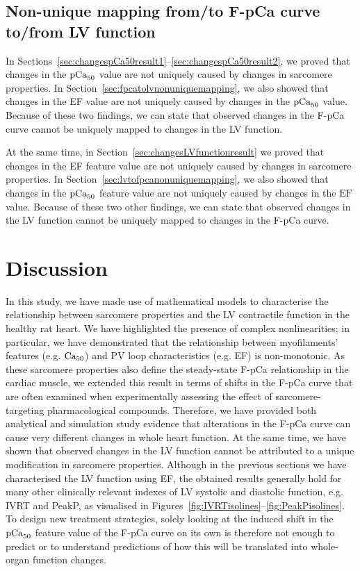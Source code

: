 %
%
%
\subsection{Non-unique mapping from/to F-pCa curve to/from LV function}\label{sec:ch8nonuniquemappings}
In Sections~\ref{sec:changespCa50result1}--\ref{sec:changespCa50result2}, we proved that changes in the $\textrm{pCa}_{50}$ value are not uniquely caused by changes in sarcomere properties. In Section~\ref{sec:fpcatolvnonuniquemapping}, we also showed that changes in the EF value are not uniquely caused by changes in the $\textrm{pCa}_{50}$ value. Because of these two findings, we can state that observed changes in the F-pCa curve cannot be uniquely mapped to changes in the LV function.

\vspace{0.2cm}
At the same time, in Section~\ref{sec:changesLVfunctionresult} we proved that changes in the EF feature value are not uniquely caused by changes in sarcomere properties. In Section~\ref{sec:lvtofpcanonuniquemapping}, we also showed that changes in the $\textrm{pCa}_{50}$ feature value are not uniquely caused by changes in the $\textrm{EF}$ value. Because of these two other findings, we can state that observed changes in the LV function cannot be uniquely mapped to changes in the F-pCa curve.


%
%
%
\section{Discussion}\label{sec:ch8discussion}
In this study, we have made use of mathematical models to characterise the relationship between sarcomere properties and the LV contractile function in the healthy rat heart. We have highlighted the presence of complex nonlinearities; in particular, we have demonstrated that the relationship between myofilaments' features (e.g. $\textrm{Ca}_{50}$) and PV loop characteristics (e.g. EF) is non-monotonic. As these sarcomere properties also define the steady-state F-pCa relationship in the cardiac muscle, we extended this result in terms of shifts in the F-pCa curve that are often examined when experimentally assessing the effect of sarcomere-targeting pharmacological compounds. Therefore, we have provided both analytical and simulation study evidence that alterations in the F-pCa curve can cause very different changes in whole heart function. At the same time, we have shown that observed changes in the LV function cannot be attributed to a unique modification in sarcomere properties. Although in the previous sections we have characterised the LV function using EF, the obtained results generally hold for many other clinically relevant indexes of LV systolic and diastolic function, e.g. IVRT and PeakP, as visualised in Figures~\ref{fig:IVRTisolines}--\ref{fig:PeakPisolines}. To design new treatment strategies, solely looking at the induced shift in the $\textrm{pCa}_{50}$ feature value of the F-pCa curve on its own is therefore not enough to predict or to understand predictions of how this will be translated into whole-organ function changes.

